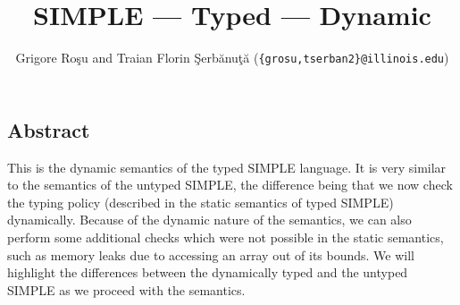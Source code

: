 \setlength{\parindent}{1em}
\title{SIMPLE --- Typed --- Dynamic}
\author{Grigore Ro\c{s}u and 
        Traian Florin \c{S}erb\u{a}nu\c{t}\u{a}
        (\texttt{\{grosu,tserban2\}@illinois.edu})}

\maketitle

\begin{kblock}[text]
\section{Abstract}
This is the \K dynamic semantics of the typed SIMPLE language.
It is very similar to the semantics of the untyped SIMPLE, the
difference being that we now check the typing policy (described in
the static semantics of typed SIMPLE) dynamically.  Because of the
dynamic nature of the semantics, we can also perform some additional
checks which were not possible in the static semantics, such as
memory leaks due to accessing an array out of its bounds.  We will
highlight the differences between the dynamically typed and the
untyped SIMPLE as we proceed with the semantics.
\end{kblock}

\vspace*{3ex}
